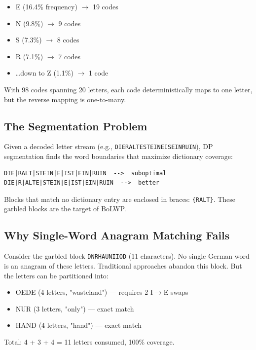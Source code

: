 \documentclass[11pt,a4paper]{article}
\begin{document}
\begin{itemize}
\item E (16.4\% frequency) $\rightarrow$ 19 codes
\item N (9.8\%) $\rightarrow$ 9 codes
\item S (7.3\%) $\rightarrow$ 8 codes
\item R (7.1\%) $\rightarrow$ 7 codes
\item \ldots down to Z (1.1\%) $\rightarrow$ 1 code
\end{itemize}

With 98 codes spanning 20 letters, each code deterministically maps to one letter, but the reverse mapping is one-to-many.

\subsection{The Segmentation Problem}

Given a decoded letter stream (e.g., \texttt{DIERALTESTEINEISEINRUIN}), DP segmentation finds the word boundaries that maximize dictionary coverage:

\begin{lstlisting}[style=plain]
DIE|RALT|STEIN|E|IST|EIN|RUIN  -->  suboptimal
DIE|R|ALTE|STEIN|E|IST|EIN|RUIN  -->  better
\end{lstlisting}

Blocks that match no dictionary entry are enclosed in braces: \texttt{\{RALT\}}. These garbled blocks are the target of BoLWP.

\subsection{Why Single-Word Anagram Matching Fails}

Consider the garbled block \texttt{DNRHAUNIIOD} (11 characters). No single German word is an anagram of these letters. Traditional approaches abandon this block. But the letters can be partitioned into:

\begin{itemize}
\item OEDE (4 letters, "wasteland") --- requires 2 I$\rightarrow$E swaps
\item NUR (3 letters, "only") --- exact match
\item HAND (4 letters, "hand") --- exact match
\end{itemize}

Total: 4 + 3 + 4 = 11 letters consumed, 100\% coverage.
\end{document}
